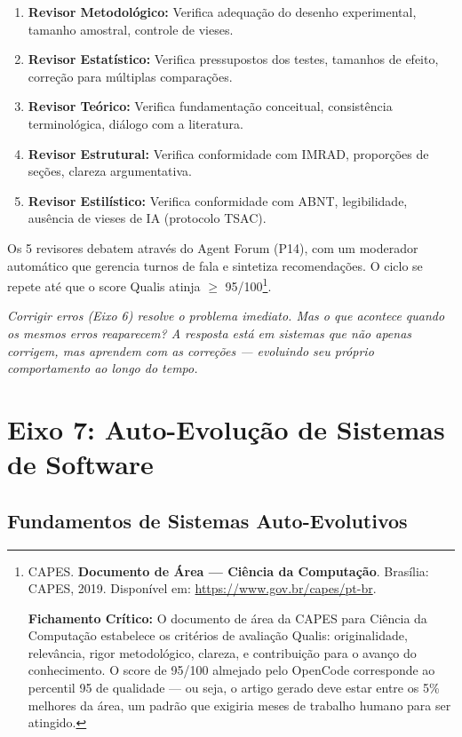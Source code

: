 \begin{enumerate}
  \item \textbf{Revisor Metodológico:} Verifica adequação do desenho experimental, tamanho amostral, controle de vieses.
  \item \textbf{Revisor Estatístico:} Verifica pressupostos dos testes, tamanhos de efeito, correção para múltiplas comparações.
  \item \textbf{Revisor Teórico:} Verifica fundamentação conceitual, consistência terminológica, diálogo com a literatura.
  \item \textbf{Revisor Estrutural:} Verifica conformidade com IMRAD, proporções de seções, clareza argumentativa.
  \item \textbf{Revisor Estilístico:} Verifica conformidade com ABNT, legibilidade, ausência de vieses de IA (protocolo TSAC).
\end{enumerate}

Os 5 revisores debatem através do Agent Forum (P14), com um moderador automático que gerencia turnos de fala e sintetiza recomendações. O ciclo se repete até que o score Qualis atinja $\geq$ 95/100\footnote{
  CAPES. \textbf{Documento de Área --- Ciência da Computação}. Brasília: CAPES, 2019. Disponível em: \url{https://www.gov.br/capes/pt-br}.

  \textbf{Fichamento Crítico:} O documento de área da CAPES para Ciência da Computação estabelece os critérios de avaliação Qualis: originalidade, relevância, rigor metodológico, clareza, e contribuição para o avanço do conhecimento. O score de 95/100 almejado pelo OpenCode corresponde ao percentil 95 de qualidade --- ou seja, o artigo gerado deve estar entre os 5\% melhores da área, um padrão que exigiria meses de trabalho humano para ser atingido.
}.

{\small\itshape Corrigir erros (Eixo 6) resolve o problema imediato. Mas o que acontece quando os mesmos erros reaparecem? A resposta está em sistemas que não apenas corrigem, mas aprendem com as correções — evoluindo seu próprio comportamento ao longo do tempo.}

\section{Eixo 7: Auto-Evolução de Sistemas de Software}

\subsection{Fundamentos de Sistemas Auto-Evolutivos}

